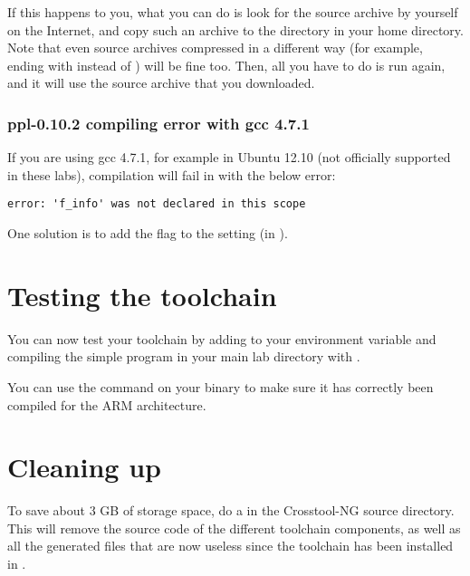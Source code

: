 If this happens to you, what you can do is look for the source archive by
yourself on the Internet, and copy such an archive to the 
directory in your home directory. Note that even source archives
compressed in a different way (for example, ending with 
instead of ) will be fine too. Then, all you have to do is run
 again, and it will use the source archive that you
downloaded.

\subsubsection{ppl-0.10.2 compiling error with gcc 4.7.1}

If you are using gcc 4.7.1, for example in Ubuntu 12.10 (not officially
supported in these labs), compilation will fail in  with
the below error:

\begin{verbatim}
error: 'f_info' was not declared in this scope
\end{verbatim}

One solution is to add the  flag to the
 setting (in ). 

\section{Testing the toolchain}

You can now test your toolchain by adding
 to your
 environment variable and compiling the simple
 program in your main lab directory with
.

You can use the  command on your binary to make sure it has
correctly been compiled for the ARM architecture.

\section{Cleaning up}

To save about 3 GB of storage space, do a  in the
Crosstool-NG source directory. This will remove the source code of the
different toolchain components, as well as all the generated files
that are now useless since the toolchain has been installed in
.
